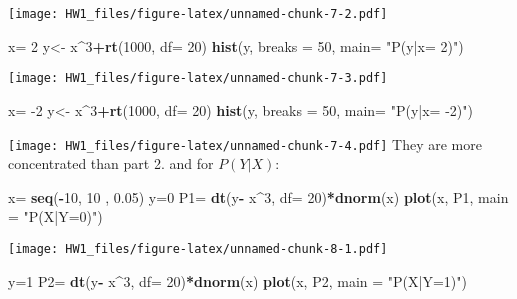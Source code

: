 \documentclass[]{article}
\newenvironment{Shaded}{\begin{snugshade}}{\end{snugshade}}
\newcommand{\DataTypeTok}[1]{\textcolor[rgb]{0.13,0.29,0.53}{#1}}
\newcommand{\DecValTok}[1]{\textcolor[rgb]{0.00,0.00,0.81}{#1}}
\newcommand{\FloatTok}[1]{\textcolor[rgb]{0.00,0.00,0.81}{#1}}
\newcommand{\KeywordTok}[1]{\textcolor[rgb]{0.13,0.29,0.53}{\textbf{#1}}}
\newcommand{\NormalTok}[1]{#1}
\newcommand{\OperatorTok}[1]{\textcolor[rgb]{0.81,0.36,0.00}{\textbf{#1}}}
\newcommand{\StringTok}[1]{\textcolor[rgb]{0.31,0.60,0.02}{#1}}
\begin{document}
\texttt{[image: HW1\_files/figure-latex/unnamed-chunk-7-2.pdf]}

\begin{Shaded}
\begin{Highlighting}[]
\NormalTok{x=}\StringTok{ }\DecValTok{2}
\NormalTok{y<-}\StringTok{ }\NormalTok{x}\OperatorTok{^}\DecValTok{3}\OperatorTok{+}\KeywordTok{rt}\NormalTok{(}\DecValTok{1000}\NormalTok{, }\DataTypeTok{df=} \DecValTok{20}\NormalTok{)}
\KeywordTok{hist}\NormalTok{(y, }\DataTypeTok{breaks =}  \DecValTok{50}\NormalTok{, }\DataTypeTok{main=} \StringTok{"P(y|x= 2)"}\NormalTok{)}
\end{Highlighting}
\end{Shaded}

\texttt{[image: HW1\_files/figure-latex/unnamed-chunk-7-3.pdf]}

\begin{Shaded}
\begin{Highlighting}[]
\NormalTok{x=}\StringTok{ }\DecValTok{-2}
\NormalTok{y<-}\StringTok{ }\NormalTok{x}\OperatorTok{^}\DecValTok{3}\OperatorTok{+}\KeywordTok{rt}\NormalTok{(}\DecValTok{1000}\NormalTok{, }\DataTypeTok{df=} \DecValTok{20}\NormalTok{)}
\KeywordTok{hist}\NormalTok{(y, }\DataTypeTok{breaks =}  \DecValTok{50}\NormalTok{, }\DataTypeTok{main=} \StringTok{"P(y|x= -2)"}\NormalTok{)}
\end{Highlighting}
\end{Shaded}

\texttt{[image: HW1\_files/figure-latex/unnamed-chunk-7-4.pdf]} They are
more concentrated than part 2. and for \(P(Y|X)\):

\begin{Shaded}
\begin{Highlighting}[]
\NormalTok{x=}\StringTok{ }\KeywordTok{seq}\NormalTok{(}\OperatorTok{-}\DecValTok{10}\NormalTok{, }\DecValTok{10}\NormalTok{ , }\FloatTok{0.05}\NormalTok{)}
\NormalTok{y=}\DecValTok{0}
\NormalTok{P1=}\StringTok{ }\KeywordTok{dt}\NormalTok{(y}\OperatorTok{-}\StringTok{ }\NormalTok{x}\OperatorTok{^}\DecValTok{3}\NormalTok{, }\DataTypeTok{df=} \DecValTok{20}\NormalTok{)}\OperatorTok{*}\KeywordTok{dnorm}\NormalTok{(x)}
\KeywordTok{plot}\NormalTok{(x, P1, }\DataTypeTok{main =} \StringTok{"P(X|Y=0)"}\NormalTok{)}
\end{Highlighting}
\end{Shaded}

\texttt{[image: HW1\_files/figure-latex/unnamed-chunk-8-1.pdf]}

\begin{Shaded}
\begin{Highlighting}[]
\NormalTok{y=}\DecValTok{1}
\NormalTok{P2=}\StringTok{ }\KeywordTok{dt}\NormalTok{(y}\OperatorTok{-}\StringTok{ }\NormalTok{x}\OperatorTok{^}\DecValTok{3}\NormalTok{, }\DataTypeTok{df=} \DecValTok{20}\NormalTok{)}\OperatorTok{*}\KeywordTok{dnorm}\NormalTok{(x)}
\KeywordTok{plot}\NormalTok{(x, P2, }\DataTypeTok{main =} \StringTok{"P(X|Y=1)"}\NormalTok{)}
\end{Highlighting}
\end{Shaded}
\end{document}
